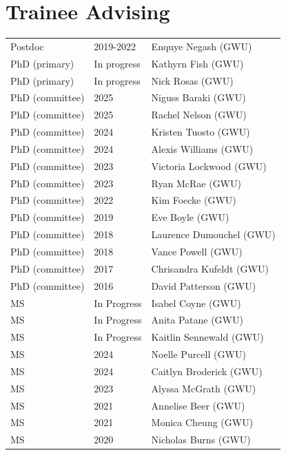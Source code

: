 \documentclass{article}
\begin{document}
\section*{Trainee Advising}
\begin{tabular}{p{}p{}p{}}
Postdoc & 2019-2022 & Enquye Negash (GWU)\\[4pt]
PhD (primary) & In progress & Kathyrn Fish (GWU)\\[4pt] %
PhD (primary) & In progress & Nick Rosas (GWU)\\[4pt] %
PhD (committee) & 2025 & Niguss Baraki (GWU)\\[4pt]
PhD (committee) & 2025 & Rachel Nelson (GWU)\\[4pt]
PhD (committee) & 2024 & Kristen Tuosto (GWU)\\[4pt]
PhD (committee) & 2024 & Alexis Williams (GWU)\\[4pt]
PhD (committee) & 2023 & Victoria Lockwood (GWU)\\[4pt]
PhD (committee) & 2023 & Ryan McRae (GWU)\\[4pt]
PhD (committee) & 2022 & Kim Foecke (GWU)\\[4pt]
PhD (committee) & 2019 & Eve Boyle (GWU)\\[4pt]
PhD (committee) & 2018 & Laurence Dumouchel (GWU)\\[4pt]
PhD (committee) & 2018 & Vance Powell (GWU)\\[4pt]
PhD (committee) & 2017 & Chrisandra Kufeldt (GWU)\\[4pt]
PhD (committee) & 2016 & David Patterson (GWU)\\

MS & In Progress & Isabel Coyne (GWU)\\[4pt]%
MS & In Progress & Anita Patane (GWU)\\[4pt]%
MS & In Progress & Kaitlin Sennewald (GWU)\\[4pt]%
MS & 2024 & Noelle Purcell (GWU)\\[4pt]%
MS & 2024 & Caitlyn Broderick (GWU)\\[4pt]%
MS & 2023 & Alyssa McGrath (GWU)\\[4pt]%
MS & 2021 & Annelise Beer (GWU)\\[4pt]
MS & 2021 & Monica Cheung (GWU)\\[4pt]
MS & 2020 & Nicholas Burns (GWU)\\[4pt] %
\end{tabular}
\end{document}
